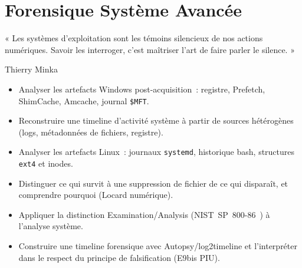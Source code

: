 
\chapter{Forensique Système Avancée}
\label{chap:for-sys}

\epigraph{%
    « Les systèmes d'exploitation sont les témoins silencieux de nos
    actions numériques. Savoir les interroger, c'est maîtriser l'art
    de faire parler le silence. »%
}{Thierry Minka}


\begin{boxobjectifs}
\begin{itemize}
    \item Analyser les artefacts Windows post-acquisition~: registre,
          Prefetch, ShimCache, Amcache, journal \texttt{\$MFT}.
    \item Reconstruire une timeline d'activité système à partir de
          sources hétérogènes (logs, métadonnées de fichiers, registre).
    \item Analyser les artefacts Linux~: journaux \texttt{systemd},
          historique bash, structures \texttt{ext4} et inodes.
    \item Distinguer ce qui survit à une suppression de fichier de ce
          qui disparaît, et comprendre pourquoi (Locard numérique).
    \item Appliquer la distinction Examination/Analysis (NIST~SP~800-86~\cite{nist80086})
          à l'analyse système.
    \item Construire une timeline forensique avec Autopsy/log2timeline
          et l'interpréter dans le respect du principe de falsification
          (E9bis PIU).
\end{itemize}
\end{boxobjectifs}

\bigskip

